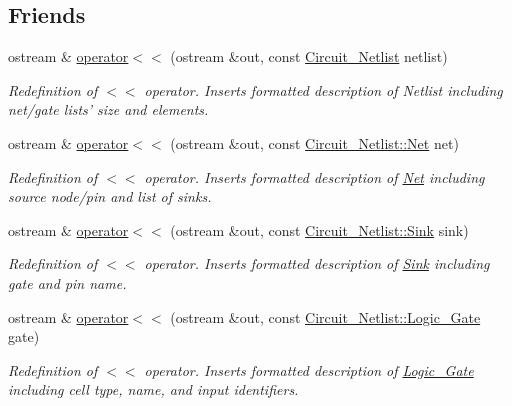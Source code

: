 \subsection*{Friends}
\begin{DoxyCompactItemize}
\item 
ostream \& \hyperlink{classCircuit__Netlist_a89e0a93d3704bd2eef19ab4ef0f1aa93}{operator$<$$<$} (ostream \&out, const \hyperlink{classCircuit__Netlist}{Circuit\-\_\-\-Netlist} netlist)
\begin{DoxyCompactList}\small\item\em Redefinition of $<$$<$ operator. Inserts formatted description of Netlist including net/gate lists' size and elements. \end{DoxyCompactList}\item 
ostream \& \hyperlink{classCircuit__Netlist_a27d57f1e1851e567c639f9f60314bb35}{operator$<$$<$} (ostream \&out, const \hyperlink{structCircuit__Netlist_1_1Net}{Circuit\-\_\-\-Netlist\-::\-Net} net)
\begin{DoxyCompactList}\small\item\em Redefinition of $<$$<$ operator. Inserts formatted description of \hyperlink{structCircuit__Netlist_1_1Net}{Net} including source node/pin and list of sinks. \end{DoxyCompactList}\item 
ostream \& \hyperlink{classCircuit__Netlist_ac126ec5485445418dca89714e6127245}{operator$<$$<$} (ostream \&out, const \hyperlink{structCircuit__Netlist_1_1Sink}{Circuit\-\_\-\-Netlist\-::\-Sink} sink)
\begin{DoxyCompactList}\small\item\em Redefinition of $<$$<$ operator. Inserts formatted description of \hyperlink{structCircuit__Netlist_1_1Sink}{Sink} including gate and pin name. \end{DoxyCompactList}\item 
ostream \& \hyperlink{classCircuit__Netlist_a14704ccb54893bee9c46df994cb63686}{operator$<$$<$} (ostream \&out, const \hyperlink{structCircuit__Netlist_1_1Logic__Gate}{Circuit\-\_\-\-Netlist\-::\-Logic\-\_\-\-Gate} gate)
\begin{DoxyCompactList}\small\item\em Redefinition of $<$$<$ operator. Inserts formatted description of \hyperlink{structCircuit__Netlist_1_1Logic__Gate}{Logic\-\_\-\-Gate} including cell type, name, and input identifiers. \end{DoxyCompactList}\end{DoxyCompactItemize}


